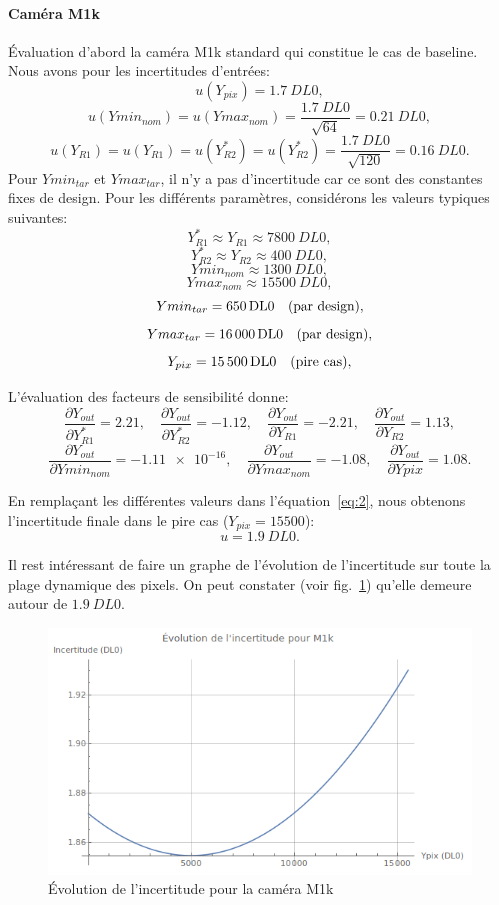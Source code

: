 \documentclass[11pt]{report}
\newcommand{\pd}[2]{\frac{\partial{#1}}{\partial{#2}}}
\newcommand{\sfone}{\pd{Y_{out}}{Y_{R1}^*}}
\newcommand{\sftwo}{\pd{Y_{out}}{Y_{R2}^*}}
\newcommand{\sfthree}{\pd{Y_{out}}{Y_{R1}}}
\newcommand{\sffour}{\pd{Y_{out}}{Y_{R2}}}
\newcommand{\sffive}{\pd{Y_{out}}{Ymin_{nom}}}
\newcommand{\sfsix}{\pd{Y_{out}}{Ymax_{nom}}}
\newcommand{\sfseven}{\pd{Y_{out}}{Y{pix}}}
\newcommand{\errqty}[1]{\qty{#1}{\unit{DL0}}}
\begin{document}
\paragraph{Caméra M1k}
Évaluation d'abord la caméra M1k standard qui constitue le cas de baseline. Nous avons pour les incertitudes d'entrées:
\[u(Y_{pix})=\errqty{1.7},\]
\[u(Ymin_{nom})=u(Ymax_{nom})=\frac{\errqty{1.7}}{\sqrt{64}}=\errqty{0.21},\]
\[u(Y_{R1})=u(Y_{R1})=u(Y_{R2}^*)=u(Y_{R2}^*)=\frac{\errqty{1.7}}{\sqrt{120}}=\errqty{0.16}.\]
Pour $Ymin_{tar}$ et $Ymax_{tar}$, il n'y a pas d'incertitude car ce sont des constantes fixes de design. Pour les différents paramètres, considérons les valeurs typiques suivantes:
\[Y_{R1}^*\approx{}Y_{R1}\approx\errqty{7800},\]
\[Y_{R2}^*\approx{}Y_{R2}\approx\errqty{400},\]
\[Ymin_{nom}\approx\errqty{1300},\]
\[Ymax_{nom}\approx\errqty{15500},\]
\[Ymin_{tar}=\errqty{650}\text{\quad(par design)},\]
\[Ymax_{tar}=\errqty{16000}\text{\quad(par design)},\]
\[Y_{pix}=\errqty{15500}\text{\quad(pire cas)},\]

L'évaluation des facteurs de sensibilité donne:
\[\sfone=2.21,\quad\sftwo=-1.12,\quad\sfthree=-2.21,\quad\sffour=1.13,\]
\[\sffive=\num{-1.11e-16},\quad\sfsix=-1.08,\quad\sfseven=1.08.\]

En remplaçant les différentes valeurs dans l'équation~\eqref{eq:2}, nous obtenons l'incertitude finale dans le pire cas ($Y_{pix}=15500$): 
\[u=\errqty{1.9}.\]

Il rest intéressant de faire un graphe de l'évolution de l'incertitude sur toute la plage dynamique des pixels. On peut constater (voir fig.~\ref{fig:Plot_M1k}) qu'elle demeure autour de $\errqty{1.9}$.

\begin{figure}[ht]
  \centering
  \includegraphics[width=1.0\textwidth]{Plot_M1k}
  \caption{Évolution de l'incertitude pour la caméra M1k}
  \label{fig:Plot_M1k}
\end{figure}
\pagebreak
\end{document}
